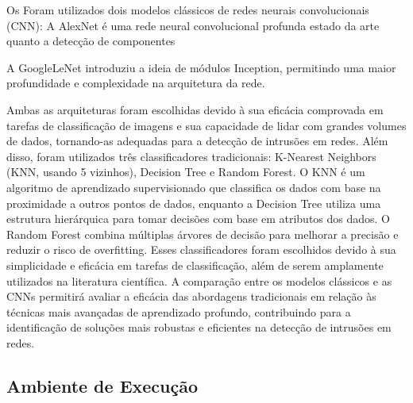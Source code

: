 \documentclass[conference]{IEEEtran}
\begin{document}
Os Foram utilizados dois modelos clássicos de redes neurais convolucionais (CNN): 
    A AlexNet é uma rede neural convolucional profunda estado da arte quanto a detecção de componentes
    
    A GoogleLeNet introduziu a ideia de módulos Inception, permitindo uma maior profundidade e complexidade na arquitetura da rede.
    
    Ambas as arquiteturas foram escolhidas devido à sua eficácia comprovada em tarefas de classificação de imagens e sua capacidade de lidar com grandes volumes de dados, tornando-as adequadas para a detecção de intrusões em redes.
    Além disso, foram utilizados três classificadores tradicionais: K-Nearest Neighbors (KNN, usando 5 vizinhos), Decision Tree e Random Forest. O KNN é um algoritmo de aprendizado supervisionado que classifica os dados com base na proximidade a outros pontos de dados, enquanto a Decision Tree utiliza uma estrutura hierárquica para tomar decisões com base em atributos dos dados. O Random Forest combina múltiplas árvores de decisão para melhorar a precisão e reduzir o risco de overfitting.
    Esses classificadores foram escolhidos devido à sua simplicidade e eficácia em tarefas de classificação, além de serem amplamente utilizados na literatura científica\cite{b6}. A comparação entre os modelos clássicos e as CNNs permitirá avaliar a eficácia das abordagens tradicionais em relação às técnicas mais avançadas de aprendizado profundo, contribuindo para a identificação de soluções mais robustas e eficientes na detecção de intrusões em redes.


\subsection{Ambiente de Execução}
\end{document}
